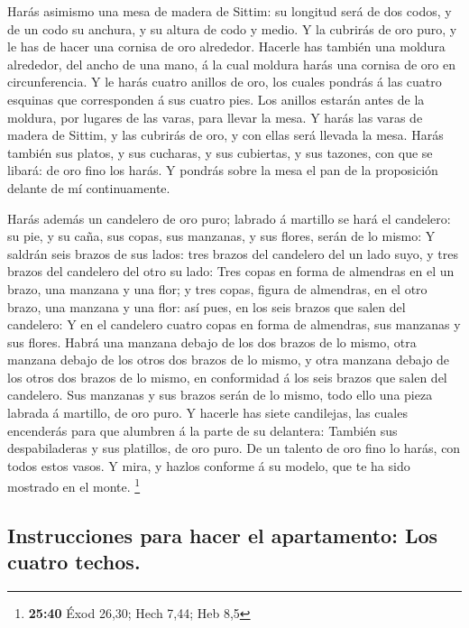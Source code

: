  Harás asimismo una mesa de madera de Sittim: su longitud
será de dos codos, y de un codo su anchura, y su altura de codo y medio.
 Y la cubrirás de oro puro, y le has de hacer una cornisa
de oro alrededor.  Hacerle has también una moldura
alrededor, del ancho de una mano, á la cual moldura harás una cornisa de
oro en circunferencia.  Y le harás cuatro anillos de oro,
los cuales pondrás á las cuatro esquinas que corresponden á sus cuatro
pies.  Los anillos estarán antes de la moldura, por
lugares de las varas, para llevar la mesa.  Y harás las
varas de madera de Sittim, y las cubrirás de oro, y con ellas será
llevada la mesa.  Harás también sus platos, y sus
cucharas, y sus cubiertas, y sus tazones, con que se libará: de oro fino
los harás.  Y pondrás sobre la mesa el pan de la
proposición delante de mí continuamente.

 Harás además un candelero de oro puro; labrado á
martillo se hará el candelero: su pie, y su caña, sus copas, sus
manzanas, y sus flores, serán de lo mismo:  Y saldrán
seis brazos de sus lados: tres brazos del candelero del un lado suyo, y
tres brazos del candelero del otro su lado:  Tres copas
en forma de almendras en el un brazo, una manzana y una flor; y tres
copas, figura de almendras, en el otro brazo, una manzana y una flor:
así pues, en los seis brazos que salen del candelero:  Y
en el candelero cuatro copas en forma de almendras, sus manzanas y sus
flores.  Habrá una manzana debajo de los dos brazos de lo
mismo, otra manzana debajo de los otros dos brazos de lo mismo, y otra
manzana debajo de los otros dos brazos de lo mismo, en conformidad á los
seis brazos que salen del candelero.  Sus manzanas y sus
brazos serán de lo mismo, todo ello una pieza labrada á martillo, de oro
puro.  Y hacerle has siete candilejas, las cuales
encenderás para que alumbren á la parte de su delantera: 
También sus despabiladeras y sus platillos, de oro puro. 
De un talento de oro fino lo harás, con todos estos vasos.
 Y mira, y hazlos conforme á su modelo, que te ha sido
mostrado en el monte. \footnote{\textbf{25:40} Éxod 26,30; Hech 7,44;
  Heb 8,5}

\hypertarget{instrucciones-para-hacer-el-apartamento-los-cuatro-techos.}{%
\subsection{Instrucciones para hacer el apartamento: Los cuatro
techos.}\label{instrucciones-para-hacer-el-apartamento-los-cuatro-techos.}}

